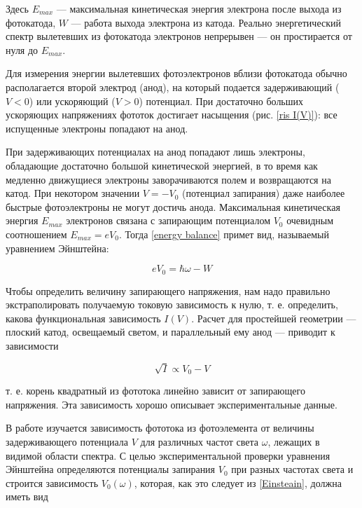 \documentclass[a4paper, 12pt]{article}
\begin{document}
Здесь $ E_{max} $ ---  максимальная кинетическая энергия электрона после выхода из фотокатода, $ W $ --- работа выхода электрона из катода. Реально энергетический спектр вылетевших из фотокатода электронов непрерывен --- он простирается от нуля до $ E_{max} $. 

Для измерения энергии вылетевших фотоэлектронов вблизи фотокатода
обычно располагается второй электрод
(анод), на который подается задерживающий ($ V < 0 $) или ускоряющий ($ V >
0 $) потенциал. При достаточно больших
ускоряющих напряжениях фототок достигает насыщения (рис. \ref{ris I(V)}): все испущенные электроны попадают на анод.

При задерживающих потенциалах на анод попадают лишь электроны,
обладающие достаточно большой кинетической энергией, в то время
как медленно движущиеся электроны заворачиваются полем и возвращаются на катод. При некотором значении $ V = -V_0 $ (потенциал запирания) даже наиболее быстрые фотоэлектроны не могут достичь
анода.
Максимальная кинетическая энергия $ E_{max} $ электронов связана с
запирающим потенциалом $ V_0 $ очевидным соотношением $ E_{max} = eV_0 $. Тогда \eqref{energy balance} примет вид, называемый уравнением Эйнштейна:

\begin{equation}\label{Einsteain}
    eV_0 = \hbar\omega - W 
\end{equation}

Чтобы определить величину запирающего
напряжения, нам надо правильно экстраполировать получаемую токовую зависимость к нулю, т. е. определить, какова функциональная
зависимость $ I(V) $. Расчет для простейшей геометрии --- плоский катод, освещаемый светом, и параллельный ему анод --- приводит к зависимости

\begin{equation}\label{sqrt I = V}
    \sqrt{I} \propto V_0 - V
\end{equation}

т. е. корень квадратный из фототока линейно
зависит от запирающего напряжения. Эта зависимость хорошо описывает экспериментальные данные.

В работе изучается зависимость фототока из фотоэлемента от величины задерживающего потенциала $ V $ для различных частот света $ \omega $, лежащих в видимой области спектра. С целью экспериментальной
проверки уравнения Эйнштейна определяются потенциалы запирания
$ V_0 $ при разных частотах света и строится зависимость $ V_0(\omega) $, которая, как это следует из \eqref{Einsteain}, должна иметь вид
\end{document}
